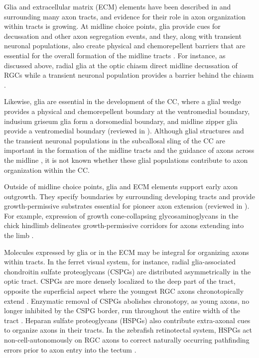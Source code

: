 \label{sec:GliaECM}
Glia and extracellular matrix (ECM) elements have been described in and surrounding many axon tracts, and evidence for their role in axon organization within tracts is growing. 
At midline choice points, glia provide cues for decussation and other axon segregation events, and they, along with transient neuronal populations, also create physical and chemorepellent barriers that are essential for the overall formation of the midline tracts \cite{raper2010cellular,suarez2014evolution}. 
For instance, as discussed above, radial glia at the optic chiasm direct midline decussation of RGCs while a transient neuronal population provides a barrier behind the chiasm \cite{petros2008retinal,raper2010cellular}.

Likewise, glia are essential in the development of the CC, where a glial wedge provides a physical and chemorepellent boundary at the ventromedial boundary, indusium griseum glia form a dorsomedial boundary, and midline zipper glia provide a ventromedial boundary (reviewed in ).
Although glial structures and the transient neuronal populations in the subcallosal sling of the CC are important in the formation of the midline tracts and the guidance of axons across the midline \cite{gobius2016astroglial}, it is not known whether these glial populations contribute to axon organization within the CC.

Outside of midline choice points, glia and ECM elements support early axon outgrowth. 
They specify boundaries by surrounding developing tracts \cite{marcus1995expression} and provide growth-permissive substrates essential for pioneer axon extension (reviewed in ). 
For example, expression of growth cone-collapsing glycosaminoglycans in the chick hindlimb delineates growth-permissive corridors for axons extending into the limb \cite{tosney1985development}. 

Molecules expressed by glia or in the ECM may be integral for organizing axons within tracts. 
In the ferret visual system, for instance, radial glia-associated chondroitin sulfate proteoglycans (CSPGs) are distributed asymmetrically in the optic tract.
CSPGs are more densely localized to the deep part of the tract, opposite the superficial aspect where the youngest RGC axons chronotopically extend \cite{reese1997chronotopic}.
Enzymatic removal of CSPGs abolishes chronotopy, as young axons, no longer inhibited by the CSPG border, run throughout the entire width of the tract \cite{leung2003enzymatic}.
Heparan sulfate proteoglycans (HSPGs) also contribute extra-axonal cues to organize axons in their tracts. 
In the zebrafish retinotectal system, HSPGs act non-cell-autonomously on RGC axons to correct naturally occurring pathfinding errors prior to axon entry into the tectum \cite{poulain2013proteoglycan}. 


